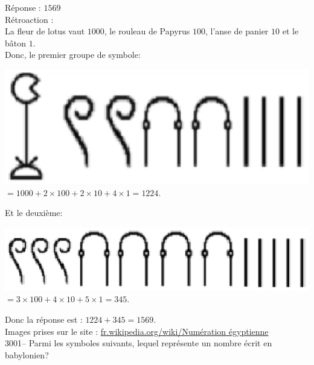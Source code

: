 \documentclass[letterpaper, 12pt]{article}
\begin{document}
R\'eponse : $1569$\\

R\'etroaction :\\
La fleur de lotus vaut $1000$, le rouleau de Papyrus $100$, l'anse de panier $10$ et le b\^aton $1$.\\
Donc, le premier groupe de symbole:\\
\begin{center}
\includegraphics[scale=0.35]{1224.eps}\\
$= 1000 + 2 \times 100 + 2 \times 10 + 4 \times 1 = 1224$.\\[4mm]
\end{center}
Et le deuxi\`eme:\\
\begin{center}
\includegraphics[scale=0.35]{345.eps}\\
$= 3 \times 100 + 4 \times 10 + 5 \times 1  = 345$.\\[4mm]
\end{center}
Donc la r\'eponse est : $1224 + 345 = 1569$.\\

Images prises sur le site : \href{http://fr.wikipedia.org/wiki/Num\%C3\%A9ration \%C3\%A9gyptienne}{fr.wikipedia.org/wiki/Num\'eration \'egyptienne}\\



3001-- Parmi les symboles suivants, lequel repr\'esente un nombre \'ecrit en babylonien?\\
\end{document}

